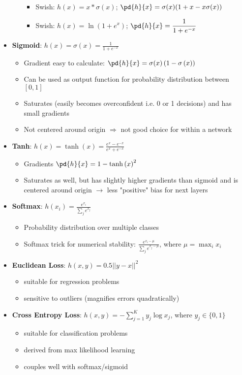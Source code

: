 \begin{itemize}
\begin{itemize}
\begin{itemize}
			\item Swish: $h(x) = x * \sigma(x)$;
					$\pd{h}{x} = \sigma(x)(1 + x - x \sigma(x))$
			\item Swish: $h(x) = \ln (1 + e^x)$;
				    $\pd{h}{x} = \dfrac{1}{1 + e^{-x}}$
		\end{itemize}
	\end{itemize}
	\item \textbf{Sigmoid}: $h(x)=\sigma(x)=\frac{1}{1+e^{-x}}$
	\begin{itemize}
		\item Gradient easy to calculate: $\pd{h}{x} = \sigma(x)\left(1-\sigma\left(x\right)\right)$
		\item Can be used as output function for probability distribution between $[0,1]$
		\item Saturates (easily becomes overconfident i.e. 0 or 1 decisions) and has small gradients
		\item Not centered around origin $\Rightarrow$ not good choice for within a network
	\end{itemize}
	\item \textbf{Tanh}: $h(x)=\tanh\left(x\right)=\frac{e^{x}-e^{-x}}{e^{x}+e^{-x}}$
	\begin{itemize}
		\item Gradients $\pd{h}{x}=1-\tanh\left(x\right)^2$
		\item Saturates as well, but has slightly higher gradients than sigmoid and is centered around origin $\rightarrow$ less "positive" bias for next layers
	\end{itemize}
	\item \textbf{Softmax}: $h(x_i) = \frac{e^{x_i}}{\sum_j e^{x_j}}$
	\begin{itemize}
		\item Probability distribution over multiple classes
		\item Softmax trick for numerical stability: $\frac{e^{x_i-\mu}}{\sum_j e^{x_j-\mu}}$, where $\mu = \max_i x_i$
	\end{itemize}
	\item \textbf{Euclidean Loss}: $h(x,y) = 0.5 ||y-x||^2$
	\begin{itemize}
		\item suitable for regression problems
		\item sensitive to outliers (magnifies errors quadratically)
	\end{itemize}
	\item \textbf{Cross Entropy Loss}: $h(x,y) = - \sum_{j=1}^{K} y_j \log x_j$, where $y_j \in \{0,1\}$
	\begin{itemize}
		\item suitable for classification problems
		\item derived from max likelihood learning
		\item couples well with softmax/sigmoid
	\end{itemize}
\end{itemize}
